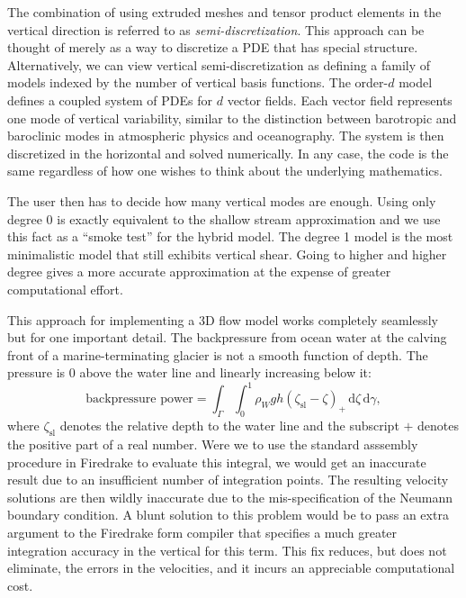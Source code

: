 \documentclass{article}
\theoremstyle{definition}
\theoremstyle{plain}
\newcommand{\ud}{\hspace{2pt}\mathrm{d}}
\begin{document}
The combination of using extruded meshes and tensor product elements in the vertical direction is referred to as \emph{semi-discretization}.
This approach can be thought of merely as a way to discretize a PDE that has special structure.
Alternatively, we can view vertical semi-discretization as defining a family of models indexed by the number of vertical basis functions.
The order-$d$ model defines a coupled system of PDEs for $d$ vector fields.
Each vector field represents one mode of vertical variability, similar to the distinction between barotropic and baroclinic modes in atmospheric physics and oceanography.
The system is then discretized in the horizontal and solved numerically.
In any case, the code is the same regardless of how one wishes to think about the underlying mathematics.

The user then has to decide how many vertical modes are enough.
Using only degree 0 is exactly equivalent to the shallow stream approximation and we use this fact as a ``smoke test'' for the hybrid model.
The degree 1 model is the most minimalistic model that still exhibits vertical shear.
Going to higher and higher degree gives a more accurate approximation at the expense of greater computational effort.

This approach for implementing a 3D flow model works completely seamlessly but for one important detail.
The backpressure from ocean water at the calving front of a marine-terminating glacier is not a smooth function of depth.
The pressure is 0 above the water line and linearly increasing below it:
\begin{equation}
    \text{backpressure power} = \int_\Gamma\int_0^1 \rho_Wgh(\zeta_{\text{sl}} - \zeta)_+\ud\zeta\ud\gamma,
    \label{backpressure}
\end{equation}
where $\zeta_{\text{sl}}$ denotes the relative depth to the water line and the subscript $+$ denotes the positive part of a real number.
Were we to use the standard asssembly procedure in Firedrake to evaluate this integral, we would get an inaccurate result due to an insufficient number of integration points.
The resulting velocity solutions are then wildly inaccurate due to the mis-specification of the Neumann boundary condition.
A blunt solution to this problem would be to pass an extra argument to the Firedrake form compiler that specifies a much greater integration accuracy in the vertical for this term.
This fix reduces, but does not eliminate, the errors in the velocities, and it incurs an appreciable computational cost.
\end{document}
